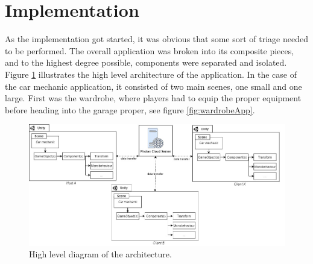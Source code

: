 \section{Implementation}
\label{section:Phase2Implentation}
As the implementation got started, it was obvious that some sort of triage needed to be performed. The overall application was broken into its composite pieces, and to the highest degree possible, components were separated and isolated. Figure \ref{fig:highLevelArchitecture} illustrates the high level architecture of the application. In the case of the car mechanic application, it consisted of two main scenes, one small and one large. First was the wardrobe, where players had to equip the proper equipment before heading into the garage proper, see figure \ref{fig:wardrobeApp}.

\begin{figure}[H]
  \centering
    \captionsetup{width=1\linewidth}
    \includegraphics[width=1\textwidth]{fig/phase_2/implementation/highLevelArchitecture.jpg}
    \caption{High level diagram of the architecture.}
\label{fig:highLevelArchitecture}
\end{figure}


